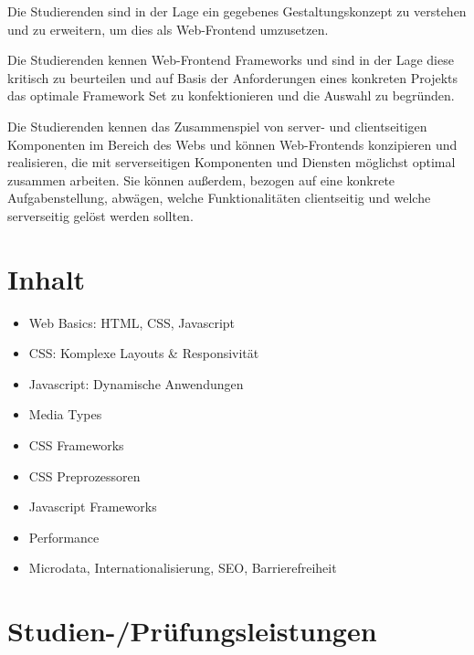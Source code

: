 Die Studierenden sind in der Lage ein gegebenes Gestaltungskonzept zu
verstehen und zu erweitern, um dies als Web-Frontend umzusetzen.

Die Studierenden kennen Web-Frontend Frameworks und sind in der Lage
diese kritisch zu beurteilen und auf Basis der Anforderungen eines
konkreten Projekts das optimale Framework Set zu konfektionieren und die
Auswahl zu begründen.

Die Studierenden kennen das Zusammenspiel von server- und clientseitigen
Komponenten im Bereich des Webs und können Web-Frontends konzipieren und
realisieren, die mit serverseitigen Komponenten und Diensten möglichst
optimal zusammen arbeiten. Sie können außerdem, bezogen auf eine
konkrete Aufgabenstellung, abwägen, welche Funktionalitäten clientseitig
und welche serverseitig gelöst werden sollten.

\hypertarget{inhaltpathlabelmi-2017modulbeschreibungen-bachelorba_wd_frontend-development}{%
\section*{Inhalt\label{/mi-2017/modulbeschreibungen-bachelor/BA_WD_Frontend-Development}}\label{inhaltpathlabelmi-2017modulbeschreibungen-bachelorba_wd_frontend-development}}

\begin{itemize}
\tightlist
\item
  Web Basics: HTML, CSS, Javascript
\item
  CSS: Komplexe Layouts \& Responsivität
\item
  Javascript: Dynamische Anwendungen
\item
  Media Types
\item
  CSS Frameworks
\item
  CSS Preprozessoren
\item
  Javascript Frameworks
\item
  Performance
\item
  Microdata, Internationalisierung, SEO, Barrierefreiheit
\end{itemize}

\hypertarget{studien-pruxfcfungsleistungenpathlabelmi-2017modulbeschreibungen-bachelorba_wd_frontend-development}{%
\section*{Studien-/Prüfungsleistungen\label{/mi-2017/modulbeschreibungen-bachelor/BA_WD_Frontend-Development}}\label{studien-pruxfcfungsleistungenpathlabelmi-2017modulbeschreibungen-bachelorba_wd_frontend-development}}

